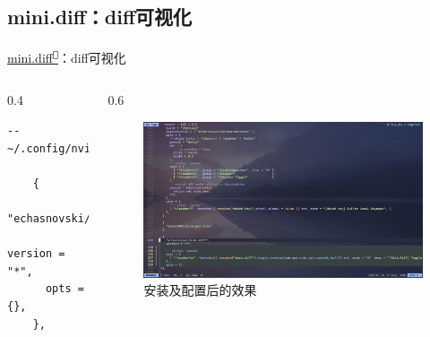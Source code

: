 \documentclass[aspectratio=169]{ctexbeamer}
\newcommand{\nerd}[1]{\texttt{#1}}
\newcommand{\link}[3][]{\href{#3}{#2\textsuperscript{\nerd{}}}}
\begin{document}
\subsection{mini.diff：diff可视化}
\begin{frame}[fragile]{\link{mini.diff}{https://github.com/echasnovski/mini.diff}：diff可视化}
  \begin{columns}
    \begin{column}{0.4\linewidth}
        \begin{lstlisting}[basicstyle=\tiny\ttfamily]
    -- ~/.config/nvim/lua/plugins/ui.lua

    {
      "echasnovski/mini.diff",
      version = "*",
      opts = {},
    },
        \end{lstlisting}
    \end{column}

    \begin{column}{0.6\linewidth}
      \begin{figure}[H]
        \centering
        \includegraphics[width=\linewidth]{./Figures/MiniDiff_Finish.jpg}
        \caption{安装及配置后的效果}%
      \end{figure}
    \end{column}
  \end{columns}
\end{frame}
\end{document}
